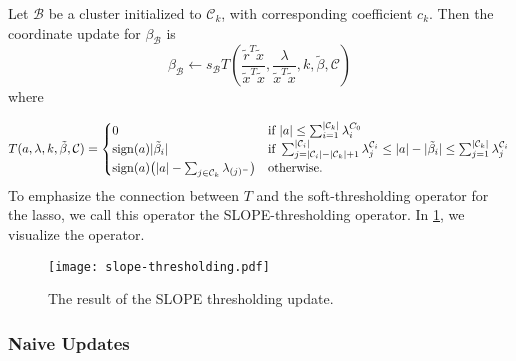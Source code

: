 Let \(\mathcal{B}\) be a cluster initialized to \(\mathcal{C}_k\), with
corresponding coefficient \(c_k\).
Then the coordinate update for \(\beta_\mathcal{B}\) is
\[
  \beta_\mathcal{B} \gets
  s_\mathcal{B}
  T \left(
  \frac{\tilde r^T \tilde x}{\tilde x^T \tilde x},
  \frac{\lambda}{\tilde x^T \tilde x},
  k,
  \tilde \beta,
  \mathcal{C}
  \right)
\]
where

\begin{equation}
  \label{eq:slope-thresholding}
  T(a, \lambda,k,\tilde \beta, \mathcal{C}) =
  \begin{cases}
    0                                                                 & \text{if } |a| \leq \sum_{i=1}^{|\mathcal{C}_k|}\lambda^{C_0}_i                                                                                                                               \\
    \operatorname{sign}(a)|\tilde \beta_i|                                          & \text{if } \sum_{j= |\mathcal{C}_i| - |\mathcal{C}_k| + 1}^{|\mathcal{C}_i|} \lambda^{\mathcal{C}_i}_j \leq |a| - |\tilde \beta_i| \leq \sum_{j=1}^{|\mathcal{C}_k|}\lambda^{\mathcal{C}_i}_j \\
    \operatorname{sign}(a)\big(|a| - \sum_{j \in \mathcal{C}_k}\lambda_{(j)^-}\big) & \text{otherwise.
    }
  \end{cases}
\end{equation}
To emphasize the connection between \(T\) and the soft-thresholding operator
for the lasso, we call this operator the SLOPE-thresholding operator.
In \cref{fig:slope-thresholding}, we visualize the operator.

\begin{figure}[htbp]
  \centering
  \texttt{[image: slope-thresholding.pdf]}
  \caption{The result of the SLOPE thresholding update.}
  \label{fig:slope-thresholding}
\end{figure}

\subsubsection{Naive Updates}

